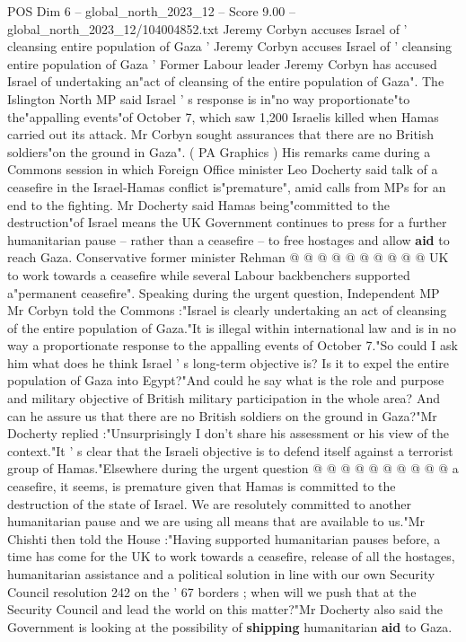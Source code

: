 \begin{textsample}{POS Dim 6 – global\_north\_2023\_12 – Score 9.00 – global\_north\_2023\_12/104004852.txt}  \label{ex:f6_pos_182}
Jeremy Corbyn accuses Israel of ' cleansing entire population of Gaza ' Jeremy Corbyn accuses Israel of ' cleansing entire population of Gaza ' Former Labour leader Jeremy Corbyn has accused Israel of undertaking an"act of cleansing of the entire population of Gaza".
The Islington North MP said Israel ' s response is in"no way proportionate"to the"appalling events"of October 7, which saw 1,200 Israelis killed when Hamas carried out its attack.
Mr Corbyn sought assurances that there are no British soldiers"on the ground in Gaza". ( PA Graphics ) His remarks came during a Commons session in which Foreign Office minister Leo Docherty said talk of a ceasefire in the Israel-Hamas conflict is"premature", amid calls from MPs for an end to the fighting.
Mr Docherty said Hamas being"committed to the destruction"of Israel means the UK Government continues to press for a further humanitarian pause -- rather than a ceasefire -- to free hostages and allow \textbf{aid} to reach Gaza.
Conservative former minister Rehman @ @ @ @ @ @ @ @ @ @ UK to work towards a ceasefire while several Labour backbenchers supported a"permanent ceasefire".
Speaking during the urgent question, Independent MP Mr Corbyn told the Commons :"Israel is clearly undertaking an act of cleansing of the entire population of Gaza."It is illegal within international law and is in no way a proportionate response to the appalling events of October 7."So could I ask him what does he think Israel ' s long-term objective is?
Is it to expel the entire population of Gaza into Egypt?"And could he say what is the role and purpose and military objective of British military participation in the whole area?
And can he assure us that there are no British soldiers on the ground in Gaza?"Mr Docherty replied :"Unsurprisingly I don't share his assessment or his view of the context."It ' s clear that the Israeli objective is to defend itself against a terrorist group of Hamas."Elsewhere during the urgent question @ @ @ @ @ @ @ @ @ @ a ceasefire, it seems, is premature given that Hamas is committed to the destruction of the state of Israel.
We are resolutely committed to another humanitarian pause and we are using all means that are available to us."Mr Chishti then told the House :"Having supported humanitarian pauses before, a time has come for the UK to work towards a ceasefire, release of all the hostages, humanitarian assistance and a political solution in line with our own Security Council resolution 242 on the ' 67 borders ; when will we push that at the Security Council and lead the world on this matter?"Mr Docherty also said the Government is looking at the possibility of \textbf{shipping} humanitarian \textbf{aid} to Gaza.

\end{textsample}
